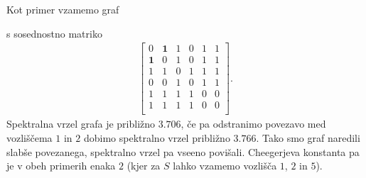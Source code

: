 \begin{primer}
    Kot primer vzamemo graf
    \begin{figure}[h!]
        \centering
    \end{figure}
    s sosednostno matriko
    \begin{align*}
        \begin{bmatrix}
            0          & \mathbf{1} & 1 & 0 & 1 & 1 \\
            \mathbf{1} & 0          & 1 & 0 & 1 & 1 \\
            1          & 1          & 0 & 1 & 1 & 1 \\
            0          & 0          & 1 & 0 & 1 & 1 \\
            1          & 1          & 1 & 1 & 0 & 0 \\
            1          & 1          & 1 & 1 & 0 & 0 \\
        \end{bmatrix}.
    \end{align*}
    Spektralna vrzel grafa je približno \(3.706\), če pa odstranimo povezavo med vozliščema \(1\) in \(2\) dobimo spektralno vrzel približno \(3.766\). Tako smo graf naredili slabše povezanega, spektralno vrzel pa vseeno povišali. Cheegerjeva konstanta pa je v obeh primerih enaka \(2\) (kjer za \(S\) lahko vzamemo vozlišča \(1\), \(2\) in \(5\)).
\end{primer}

